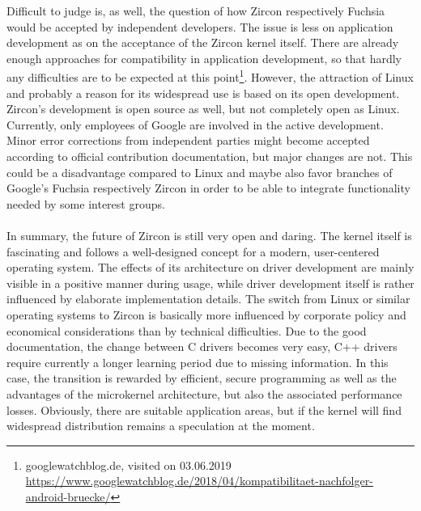 Difficult to judge is, as well, the question of how Zircon respectively Fuchsia would be accepted by independent developers.
The issue is less on application development as on the acceptance of the Zircon kernel itself.
There are already enough approaches for compatibility in application development, so that hardly any difficulties are to be expected at this point\footnote{googlewatchblog.de, visited on 03.06.2019 \url{https://www.googlewatchblog.de/2018/04/kompatibilitaet-nachfolger-android-bruecke/}}.
However, the attraction of Linux and probably a reason for its widespread use is based on its open development.
Zircon's development is open source as well, but not completely open as Linux.
Currently, only employees of Google are involved in the active development.
Minor error corrections from independent parties might become accepted according to official contribution documentation, but major changes are not.
This could be a disadvantage compared to Linux and maybe also favor branches of Google's Fuchsia respectively Zircon in order to be able to integrate functionality needed by some interest groups.
\\
\\
In summary, the future of Zircon is still very open and daring.
The kernel itself is fascinating and follows a well-designed concept for a modern, user-centered operating system.
The effects of its architecture on driver development are mainly visible in a positive manner during usage, while driver development itself is rather influenced by  elaborate implementation details.
The switch from Linux or similar operating systems to Zircon is basically more influenced by corporate policy and economical considerations than by technical difficulties.
Due to the good documentation, the change between C drivers becomes very easy, C++ drivers require currently a longer learning period due to missing information.
In this case, the transition is rewarded by efficient, secure programming as well as the advantages of the microkernel architecture, but also the associated performance losses.
Obviously, there are suitable application areas, but if the kernel will find widespread distribution remains a speculation at the moment.
